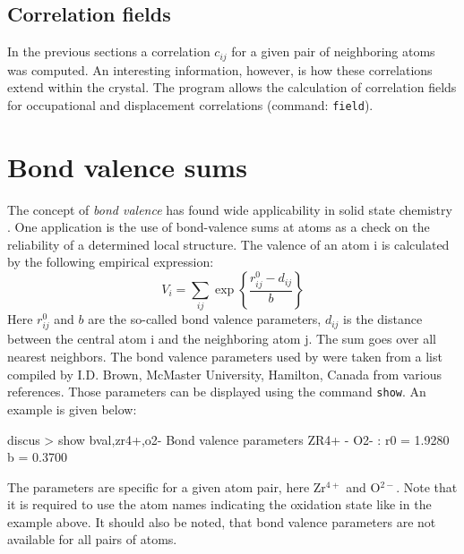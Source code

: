 \subsection*{Correlation fields \label{chem-corr-field}}

In the previous sections a correlation $c_{ij}$ for a given pair of
neighboring atoms was computed. An interesting information, however,
is how these correlations extend within the crystal. The program
\Discus allows the calculation of correlation fields for
occupational and displacement correlations (command: {\tt field}).


\section{Bond valence sums \label{chem-bval}}

The concept of {\it bond valence} has found wide applicability in
solid state chemistry \citep{bral85,brok91}. One application is
the use of bond-valence sums at atoms as a check on the
reliability of a determined local structure. The valence of an
atom i is calculated by the following empirical expression:
%
\begin{equation}
  V_{i} = \sum_{ij} \exp \left\{ \frac{r^{0}_{ij} - d_{ij}}{b} \right\}
  \label{chem-eq-bval}
\end{equation}
%
Here $r^{0}_{ij}$ and $b$ are the so-called bond valence parameters,
$d_{ij}$ is the distance between the central atom i and the
neighboring atom j. The sum goes over all nearest neighbors. The
bond valence parameters used by \Discus were taken from a list
compiled by I.D. Brown, McMaster University, Hamilton, Canada from
various references. Those parameters can be displayed using the
command {\tt show}. An example is given below:
%
\begin{MacVerbatim}
    discus > show bval,zr4+,o2-
    Bond valence parameters ZR4+ - O2-  : r0 =  1.9280 b =  0.3700
\end{MacVerbatim}
%
The parameters are specific for a given atom pair, here Zr$^{4+}$
and O$^{2-}$. Note that it is required to use the atom names
indicating the oxidation state like in the example above. It should
also be noted, that bond valence parameters are not available for
all pairs of atoms.


